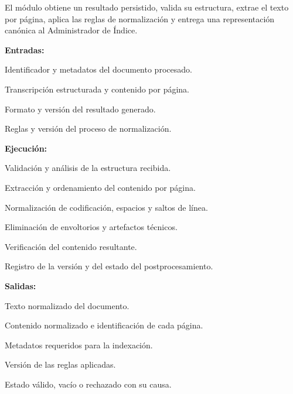 \begin{definicionmodulo}
\item[Estructura general] El módulo obtiene un resultado persistido, valida su estructura, extrae el texto por página, aplica las reglas de normalización y entrega una representación canónica al Administrador de Índice.

\textbf{Entradas:}
\begin{elementosmodulo}
    \item Identificador y metadatos del documento procesado.
    \item Transcripción estructurada y contenido por página.
    \item Formato y versión del resultado generado.
    \item Reglas y versión del proceso de normalización.
\end{elementosmodulo}

\textbf{Ejecución:}
\begin{elementosmodulo}
    \item Validación y análisis de la estructura recibida.
    \item Extracción y ordenamiento del contenido por página.
    \item Normalización de codificación, espacios y saltos de línea.
    \item Eliminación de envoltorios y artefactos técnicos.
    \item Verificación del contenido resultante.
    \item Registro de la versión y del estado del postprocesamiento.
\end{elementosmodulo}

\textbf{Salidas:}
\begin{elementosmodulo}
    \item Texto normalizado del documento.
    \item Contenido normalizado e identificación de cada página.
    \item Metadatos requeridos para la indexación.
    \item Versión de las reglas aplicadas.
    \item Estado válido, vacío o rechazado con su causa.
\end{elementosmodulo}

\end{definicionmodulo}



